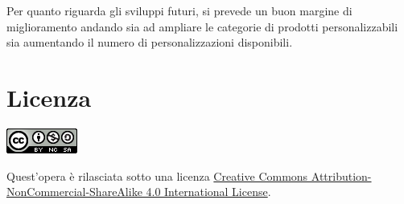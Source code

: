 \documentclass[12pt,italian,]{report}
\begin{document}
Per quanto riguarda gli sviluppi futuri, si prevede un buon margine di miglioramento andando sia ad ampliare le categorie di prodotti personalizzabili sia aumentando il numero di personalizzazioni disponibili.

\newpage
\section{Licenza}\label{licenza}

\includegraphics{img/licenza.png}

Quest'opera è rilasciata sotto una licenza
\href{https://creativecommons.org/licenses/by-nc-sa/4.0/}{Creative
Commons Attribution-NonCommercial-ShareAlike 4.0 International License}.



\end{document}
